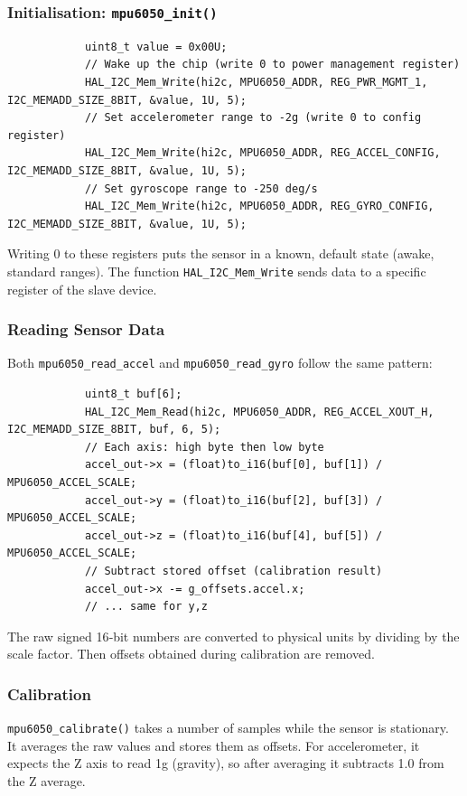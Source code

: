\documentclass[12pt,a4paper]{article}
\begin{document}
		\subsubsection{Initialisation: \texttt{mpu6050\_init()}}
		\begin{lstlisting}
			uint8_t value = 0x00U;
			// Wake up the chip (write 0 to power management register)
			HAL_I2C_Mem_Write(hi2c, MPU6050_ADDR, REG_PWR_MGMT_1, I2C_MEMADD_SIZE_8BIT, &value, 1U, 5);
			// Set accelerometer range to ‑2g (write 0 to config register)
			HAL_I2C_Mem_Write(hi2c, MPU6050_ADDR, REG_ACCEL_CONFIG, I2C_MEMADD_SIZE_8BIT, &value, 1U, 5);
			// Set gyroscope range to ‑250 deg/s
			HAL_I2C_Mem_Write(hi2c, MPU6050_ADDR, REG_GYRO_CONFIG, I2C_MEMADD_SIZE_8BIT, &value, 1U, 5);
		\end{lstlisting}
		Writing 0 to these registers puts the sensor in a known, default state (awake, standard ranges). The function \texttt{HAL\_I2C\_Mem\_Write} sends data to a specific register of the slave device.
		
		\subsubsection{Reading Sensor Data}
		Both \texttt{mpu6050\_read\_accel} and \texttt{mpu6050\_read\_gyro} follow the same pattern:
		\begin{lstlisting}
			uint8_t buf[6];
			HAL_I2C_Mem_Read(hi2c, MPU6050_ADDR, REG_ACCEL_XOUT_H, I2C_MEMADD_SIZE_8BIT, buf, 6, 5);
			// Each axis: high byte then low byte
			accel_out->x = (float)to_i16(buf[0], buf[1]) / MPU6050_ACCEL_SCALE;
			accel_out->y = (float)to_i16(buf[2], buf[3]) / MPU6050_ACCEL_SCALE;
			accel_out->z = (float)to_i16(buf[4], buf[5]) / MPU6050_ACCEL_SCALE;
			// Subtract stored offset (calibration result)
			accel_out->x -= g_offsets.accel.x;
			// ... same for y,z
		\end{lstlisting}
		The raw signed 16‑bit numbers are converted to physical units by dividing by the scale factor. Then offsets obtained during calibration are removed.
		
		\subsubsection{Calibration}
		\texttt{mpu6050\_calibrate()} takes a number of samples while the sensor is stationary. It averages the raw values and stores them as offsets. For accelerometer, it expects the Z axis to read 1g (gravity), so after averaging it subtracts 1.0 from the Z average.
		
\end{document}
